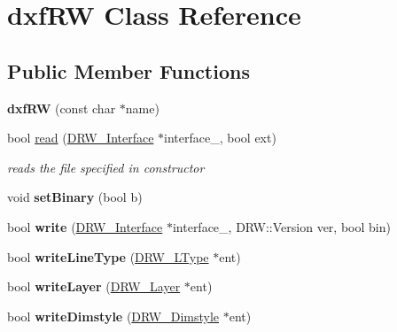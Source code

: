 \hypertarget{classdxfRW}{\section{dxf\-R\-W Class Reference}
\label{classdxfRW}
}
\subsection*{Public Member Functions}
\begin{DoxyCompactItemize}
\item 
\hypertarget{classdxfRW_af5732cd90015c3b8c7863c2a22619a9e}{{\bfseries dxf\-R\-W} (const char $\ast$name)}\label{classdxfRW_af5732cd90015c3b8c7863c2a22619a9e}

\item 
bool \hyperlink{classdxfRW_ab3262753c90b34d8911691cdddaf7bfa}{read} (\hyperlink{classDRW__Interface}{D\-R\-W\-\_\-\-Interface} $\ast$interface\-\_\-, bool ext)
\begin{DoxyCompactList}\small\item\em reads the file specified in constructor \end{DoxyCompactList}\item 
\hypertarget{classdxfRW_abdecb9e807497cfa0d00fb1a1555ad86}{void {\bfseries set\-Binary} (bool b)}\label{classdxfRW_abdecb9e807497cfa0d00fb1a1555ad86}

\item 
\hypertarget{classdxfRW_ad219bc09abae739de563462f7b2eba2f}{bool {\bfseries write} (\hyperlink{classDRW__Interface}{D\-R\-W\-\_\-\-Interface} $\ast$interface\-\_\-, D\-R\-W\-::\-Version ver, bool bin)}\label{classdxfRW_ad219bc09abae739de563462f7b2eba2f}

\item 
\hypertarget{classdxfRW_a82e6ca75949bf3042ea9cde6dd7f4491}{bool {\bfseries write\-Line\-Type} (\hyperlink{classDRW__LType}{D\-R\-W\-\_\-\-L\-Type} $\ast$ent)}\label{classdxfRW_a82e6ca75949bf3042ea9cde6dd7f4491}

\item 
\hypertarget{classdxfRW_af33446d9955ac9eb8e87bdfe9d0ffbed}{bool {\bfseries write\-Layer} (\hyperlink{classDRW__Layer}{D\-R\-W\-\_\-\-Layer} $\ast$ent)}\label{classdxfRW_af33446d9955ac9eb8e87bdfe9d0ffbed}

\item 
\hypertarget{classdxfRW_ab28d35c7f9143d4b62a0495694ae25ab}{bool {\bfseries write\-Dimstyle} (\hyperlink{classDRW__Dimstyle}{D\-R\-W\-\_\-\-Dimstyle} $\ast$ent)}\label{classdxfRW_ab28d35c7f9143d4b62a0495694ae25ab}


\end{DoxyCompactItemize}
